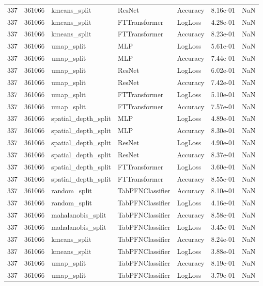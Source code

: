 \begin{tabular}{rrlllrr}
337 & 361066 & kmeans\_split & ResNet & Accuracy & 8.16e-01 & NaN \\
337 & 361066 & kmeans\_split & FTTransformer & LogLoss & 4.28e-01 & NaN \\
337 & 361066 & kmeans\_split & FTTransformer & Accuracy & 8.23e-01 & NaN \\
337 & 361066 & umap\_split & MLP & LogLoss & 5.61e-01 & NaN \\
337 & 361066 & umap\_split & MLP & Accuracy & 7.44e-01 & NaN \\
337 & 361066 & umap\_split & ResNet & LogLoss & 6.02e-01 & NaN \\
337 & 361066 & umap\_split & ResNet & Accuracy & 7.42e-01 & NaN \\
337 & 361066 & umap\_split & FTTransformer & LogLoss & 5.10e-01 & NaN \\
337 & 361066 & umap\_split & FTTransformer & Accuracy & 7.57e-01 & NaN \\
337 & 361066 & spatial\_depth\_split & MLP & LogLoss & 4.89e-01 & NaN \\
337 & 361066 & spatial\_depth\_split & MLP & Accuracy & 8.30e-01 & NaN \\
337 & 361066 & spatial\_depth\_split & ResNet & LogLoss & 4.90e-01 & NaN \\
337 & 361066 & spatial\_depth\_split & ResNet & Accuracy & 8.37e-01 & NaN \\
337 & 361066 & spatial\_depth\_split & FTTransformer & LogLoss & 3.60e-01 & NaN \\
337 & 361066 & spatial\_depth\_split & FTTransformer & Accuracy & 8.55e-01 & NaN \\
337 & 361066 & random\_split & TabPFNClassifier & Accuracy & 8.10e-01 & NaN \\
337 & 361066 & random\_split & TabPFNClassifier & LogLoss & 4.16e-01 & NaN \\
337 & 361066 & mahalanobis\_split & TabPFNClassifier & Accuracy & 8.58e-01 & NaN \\
337 & 361066 & mahalanobis\_split & TabPFNClassifier & LogLoss & 3.45e-01 & NaN \\
337 & 361066 & kmeans\_split & TabPFNClassifier & Accuracy & 8.24e-01 & NaN \\
337 & 361066 & kmeans\_split & TabPFNClassifier & LogLoss & 3.88e-01 & NaN \\
337 & 361066 & umap\_split & TabPFNClassifier & Accuracy & 8.19e-01 & NaN \\
337 & 361066 & umap\_split & TabPFNClassifier & LogLoss & 3.79e-01 & NaN \\

\end{tabular}

